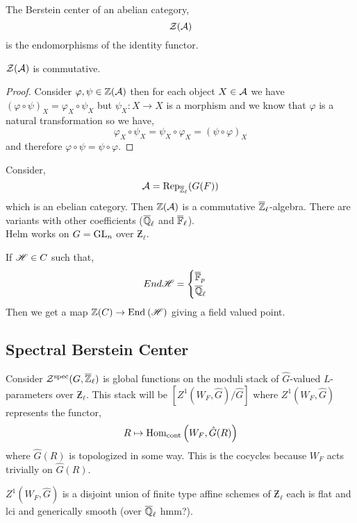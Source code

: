\documentclass[12pt]{article}
\begin{document}
\begin{defn}
The Berstein center of an abelian category,
\[ \mathcal{Z}(\mathcal{A}) \]
is the endomorphisms of the identity functor.
\end{defn}

\begin{prop}
$\mathcal{Z}(\mathcal{A})$ is commutative.
\end{prop}

\begin{proof}
Consider $\varphi, \psi \in \mathbb{Z}(\mathcal{A})$ then for each object $X \in \mathcal{A}$ we have $(\varphi \circ \psi)_X = \varphi_X \circ \psi_X$ but $\psi_X : X \to X$ is a morphism and we know that $\varphi$ is a natural transformation so we have,
\[ \varphi_X \circ \psi_X = \psi_X \circ \varphi_X = (\psi \circ \varphi)_X \]
and therefore $\varphi \circ \psi = \psi \circ \varphi$. 
\end{proof}

Consider,
\[ \mathcal{A} =  \mathrm{Rep}_{\overline{\mathbb{Z}}_\ell}(G(F)) \]
which is an ebelian category. Then $\mathbb{Z}(\mathcal{A})$ is a commutative $\overline{\mathbb{Z}}_\ell$-algebra. There are variants with other coefficients ($\overline{\mathbb{Q}}_\ell$ and $\overline{\mathbb{F}}_\ell$). 
\bigskip\\
Helm works on $G = \mathrm{GL}_n$ over $\Zbar_\ell$. 

\begin{rmk}
If $\mathscr{H} \in C$ such that, 
\[ End{\mathscr{H}} = 
\begin{cases}
\overline{\mathbb{F}}_p 
\\
\overline{\mathbb{Q}}_\ell
\end{cases} \]
Then we get a map $\mathbb{Z}(C) \to \mathrm{End}_{} \left( \mathscr{H} \right)$ giving a field valued point. 
\end{rmk}

\subsection{Spectral Berstein Center}

Consider $\mathcal{Z}^{\mathrm{spec}}(G, \overline{\mathbb{Z}}_\ell)$ is global functions on the moduli stack of $\hat{G}$-valued $L$-parameters over $\Zbar_\ell$. This stack will be $[Z^1(W_F, \hat{G}) / \hat{G}]$ where $Z^1(W_F, \hat{G})$ represents the functor,
\[ R \mapsto \mathrm{Hom}_{\text{cont}} \left( W_F, \hat{G}(R) \right) \]
where $\hat{G}(R)$ is topologized in some way. This is the cocycles because $W_F$ acts trivially on $\hat{G}(R)$.

\begin{thm}
$Z^1(W_F, \hat{G})$ is a disjoint union of finite type affine schemes of $\Zbar_\ell$ each is flat and lci and generically smooth (over $\overline{\mathbb{Q}}_\ell$ hmm?). 
\end{thm}
\end{document}
